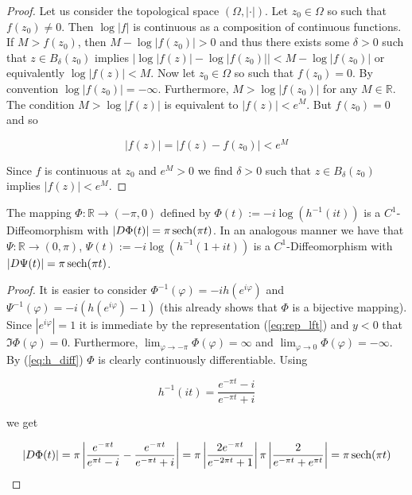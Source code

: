 \begin{proof}
	Let us consider the topological space $\left( \Omega, \left| \cdot\right| \right)$. Let $z_0 \in \Omega$ so such that $f(z_0) \neq 0$. Then $\log\left| f\right|$ is continuous as a composition of continuous functions. If $M > f(z_0)$, then $M - \log\left| f(z_0)\right| > 0$ and thus there exists some $\delta > 0$ such that $z \in B_\delta(z_0)$ implies $\left| \log\left| f(z)\right| - \log\left| f(z_0)\right|\right| < M- \log\left| f(z_0)\right|$ or equivalently $\log\left| f(z)\right| < M$. Now let $z_0 \in \Omega$ so such that $f(z_0) = 0$. By convention $\log\left| f(z_0)\right| = -\infty$. Furthermore, $M > \log\left| f(z_0)\right|$ for any $M \in \mathbb{R}$. The condition $M > \log\left| f(z)\right|$ is equivalent to $\left| f(z)\right| < e^M$. But $f(z_0) = 0$ and so

	\begin{equation*}
		\left| f(z)\right| = \left| f(z) - f(z_0)\right|< e^M
	\end{equation*}

	Since $f$ is continuous at $z_0$ and $e^M > 0$ we find $\delta > 0$ such that $z \in B_\delta(z_0)$ implies $\left| f(z)\right| < e^M$.
\end{proof}

\begin{lemma}
	The mapping $\Phi: \mathbb{R} \rightarrow (-\pi,0)$ defined by $\Phi(t) := -i\log\left( h^{-1}(it) \right)$ is a $C^1$-Diffeomorphism with $\vert D\Phi(t)\vert = \pi \operatorname{sech}(\pi t)$. In an analogous manner we have that $\Psi: \mathbb{R} \rightarrow (0,\pi)$, $\Psi(t) := -i\log\left( h^{-1}(1 + it) \right)$ is a $C^1$-Diffeomorphism with $\vert D\Psi(t)\vert = \pi \operatorname{sech}(\pi t)$.
	\label{lem:change_of_variables}
\end{lemma}

\begin{proof}
	It is easier to consider $\Phi^{-1}(\varphi) = -i h(e^{i\varphi})$ and $\Psi^{-1}(\varphi) = -i\left( h(e^{i\varphi}) - 1 \right)$ (this already shows that $\Phi$ is a bijective mapping). Since $\left| e^{i\varphi}\right| = 1$ it is immediate by the representation (\ref{eq:rep_lft}) and $y < 0$ that $\Im \Phi(\varphi) = 0$. Furthermore, $\lim_{\varphi \rightarrow -\pi} \Phi(\varphi) = \infty$ and $\lim_{\varphi \rightarrow 0} \Phi(\varphi) = -\infty$. By (\ref{eq:h_diff}) $\Phi$ is clearly continuously differentiable. Using
	
	\begin{equation*}
		h^{-1}(it) = \frac{e^{-\pi t} - i}{e^{-\pi t} + i}
	\end{equation*}
	
	we get

	\begin{gather*}
		\left| D\Phi(t)\right| = \pi\left| \frac{e^{-\pi t}}{e^{\pi t} - i} - \frac{e^{-\pi t}}{e^{-\pi t} + i}\right| = \pi\left| \frac{2e^{-\pi t}}{e^{-2\pi t} + 1}\right| \pi \left| \frac{2}{e^{-\pi t} + e^{\pi t}}\right|= \pi \operatorname{sech}(\pi t)
	\end{gather*}
\end{proof}

